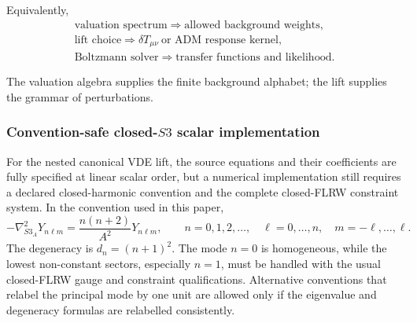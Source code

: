 \documentclass[11pt,a4paper]{article}
\def\Sthree{S3}%
\numberwithin{equation}{section}
\theoremstyle{definition}
\theoremstyle{plain}
\theoremstyle{remark}
\newcommand{\Sthree}{S^3}
\begin{document}
Equivalently,
\begin{equation}
\boxed{
\begin{array}{c}
\text{valuation spectrum}\Rightarrow\text{allowed background weights},\\[1mm]
\text{lift choice}\Rightarrow\delta T_{\mu\nu}\ \text{or ADM response kernel},\\[1mm]
\text{Boltzmann solver}\Rightarrow\text{transfer functions and likelihood}.
\end{array}}
\end{equation}

The valuation algebra supplies the finite background alphabet; the lift supplies the grammar of perturbations.

\subsubsection{Convention-safe closed-\texorpdfstring{\(\Sthree\)}{S3} scalar implementation}
\label{sec:convention-safe-numerical-domain}
For the nested canonical VDE lift, the source equations and their coefficients are fully specified at linear scalar order, but a numerical implementation still requires a declared closed-harmonic convention and the complete closed-FLRW constraint system.  In the convention used in this paper,
\begin{equation}
\boxed{
-\nabla^2_{\Sthree_A}Y_{n\ell m}
=\frac{n(n+2)}{A^2}Y_{n\ell m},
\qquad
n=0,1,2,\ldots,
\quad
\ell=0,\ldots,n,
\quad
m=-\ell,\ldots,\ell .}
\label{eq:closed-harmonic-convention-final}
\end{equation}
The degeneracy is \(d_n=(n+1)^2\).  The mode \(n=0\) is homogeneous, while the lowest non-constant sectors, especially \(n=1\), must be handled with the usual closed-FLRW gauge and constraint qualifications.  Alternative conventions that relabel the principal mode by one unit are allowed only if the eigenvalue and degeneracy formulas are relabelled consistently.
\end{document}

